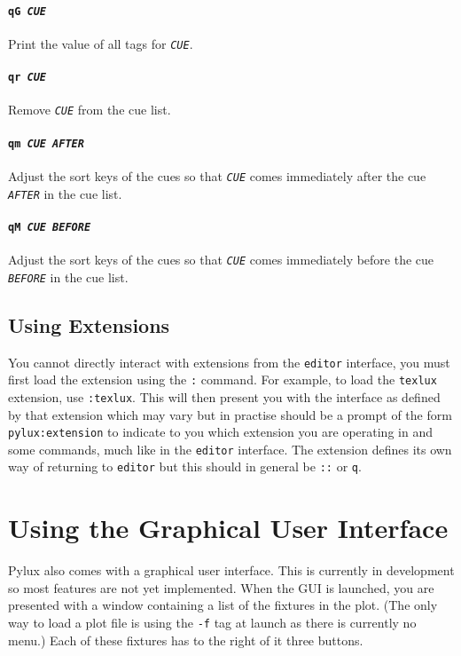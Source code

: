 \documentclass[a4paper]{article}
\begin{document}
\paragraph{\texttt{qG \textit{CUE}}}
Print the value of all tags for \texttt{\textit{CUE}}.

\paragraph{\texttt{qr \textit{CUE}}}
Remove \texttt{\textit{CUE}} from the cue list.

\paragraph{\texttt{qm \textit{CUE AFTER}}}
Adjust the sort keys of the cues so that \texttt{\textit{CUE}} comes 
immediately after the cue \texttt{\textit{AFTER}} in the cue list.

\paragraph{\texttt{qM \textit{CUE BEFORE}}}
Adjust the sort keys of the cues so that \texttt{\textit{CUE}} comes 
immediately before the cue \texttt{\textit{BEFORE}} in the cue list.

\subsection{Using Extensions}
You cannot directly interact with extensions from the \texttt{editor} 
interface, you must first load the extension using the \texttt{:} command.
For example, to load the \texttt{texlux} extension, use \texttt{:texlux}. 
This will then present you with the interface as defined by that extension 
which may vary but in practise should be a prompt of the form 
\texttt{pylux:extension} to indicate to you which extension you are 
operating in and some commands, much like in the \texttt{editor} interface.
The extension defines its own way of returning to \texttt{editor} but this 
should in general be \texttt{::} or \texttt{q}.

\section{Using the Graphical User Interface}
Pylux also comes with a graphical user interface. This is currently in 
development so most features are not yet implemented. When the GUI is 
launched, you are presented with a window containing a list of the fixtures 
in the plot. (The only way to load a plot file is using the \texttt{-f} tag 
at launch as there is currently no menu.) Each of these fixtures has to the 
right of it three buttons.
\end{document}
